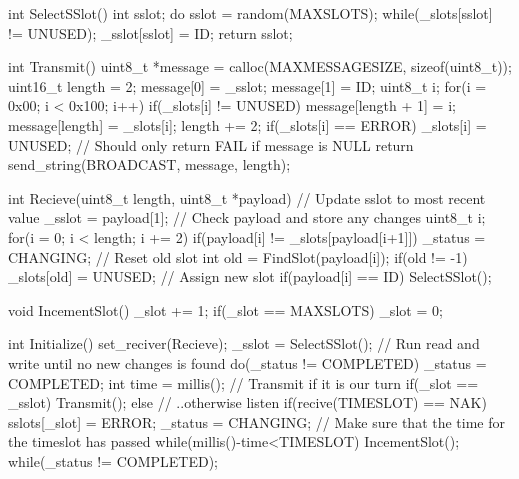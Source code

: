 int SelectSSlot() {
    int sslot;
    do {
        sslot = random(MAXSLOTS);
    } while(_slots[sslot] != UNUSED);
    _sslot[sslot] = ID;
    return sslot;
}

int Transmit(){
    uint8_t *message = calloc(MAXMESSAGESIZE, sizeof(uint8_t));
    uint16_t length = 2;
    message[0] = _sslot;
    message[1] = ID;
    uint8_t i;
    for(i = 0x00; i < 0x100; i++) {
        if(_slots[i] != UNUSED) {
            message[length + 1] = i;
            message[length] = _slots[i];
            length += 2;
            if(_slots[i] == ERROR){
                _slots[i] = UNUSED;
            }
        }
    }
    // Should only return FAIL if message is NULL
    return send_string(BROADCAST, message, length);
}

int Recieve(uint8_t length, uint8_t *payload) {
    // Update sslot to most recent value
    _sslot = payload[1];
    // Check payload and store any changes
    uint8_t i;
    for(i = 0; i < length; i += 2){
        if(payload[i] != _slots[payload[i+1]]) {
            _status = CHANGING;
            // Reset old slot
            int old = FindSlot(payload[i]);
            if(old != -1){
                _slots[old] = UNUSED;
            }
            // Assign new slot
            if(payload[i] == ID){
                SelectSSlot();
            }
        }
    }
}

void IncementSlot() {
    _slot += 1;
    if(_slot == MAXSLOTS) {
        _slot = 0;
    } 
}

int Initialize() {
    set_reciver(Recieve);
    _sslot = SelectSSlot();
    // Run read and write until no new changes is found
    do(_status != COMPLETED) {
        _status = COMPLETED;
        int time = millis();
        // Transmit if it is our turn
        if(_slot == _sslot) {
            Transmit();
        } else {
            // ..otherwise listen
            if(recive(TIMESLOT) == NAK) {
                sslots[_slot] = ERROR;
                _status = CHANGING;
            }
        }
        // Make sure that the time for the timeslot has passed
        while(millis()-time<TIMESLOT) { }
        IncementSlot();
    } while(_status != COMPLETED);
}